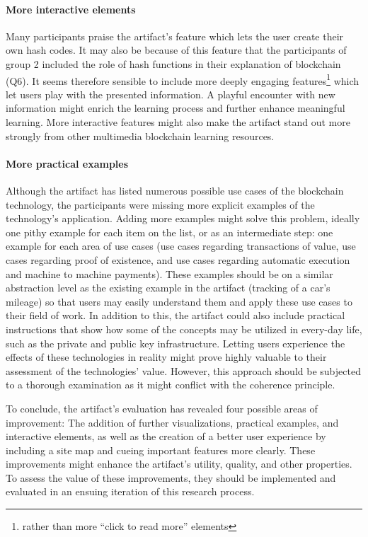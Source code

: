 \paragraph{More interactive elements} Many participants praise the artifact's feature which lets the user create their own hash codes. It may also be because of this feature that the participants of group 2 included the role of hash functions in their explanation of blockchain (Q6). It seems therefore sensible to include more deeply engaging features\footnote{rather than more \enquote{click to read more} elements} which let users play with the presented information. A playful encounter with new information might enrich the learning process and further enhance meaningful learning. More interactive features might also make the artifact stand out more strongly from other multimedia blockchain learning resources. 

\paragraph{More practical examples} Although the artifact has listed numerous possible use cases of the blockchain technology, the participants were missing more explicit examples of the technology's application. Adding more examples might solve this problem, ideally one pithy example for each item on the list, or as an intermediate step: one example for each area of use cases (use cases regarding transactions of value, use cases regarding proof of existence, and use cases regarding automatic execution and machine to machine payments). These examples should be on a similar abstraction level as the existing example in the artifact (tracking of a car's mileage) so that users may easily understand them and apply these use cases to their field of work. In addition to this, the artifact could also include practical instructions that show how some of the concepts may be utilized in every-day life, such as the private and public key infrastructure. Letting users experience the effects of these technologies in reality might prove highly valuable to their assessment of the technologies' value. However, this approach should be subjected to a thorough examination as it might conflict with the coherence principle.

To conclude, the artifact's evaluation has revealed four possible areas of improvement: The addition of further visualizations, practical examples, and interactive elements, as well as the creation of a better user experience by including a site map and cueing important features more clearly. These improvements might enhance the artifact's utility, quality, and other properties. To assess the value of these improvements, they should be implemented and evaluated in an ensuing iteration of this research process.
